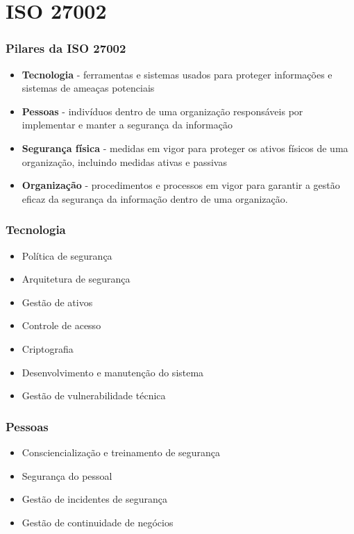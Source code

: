 \section{ISO 27002}
\begin{frame}
  \frametitle{Pilares da ISO 27002}
  \begin{itemize}
    \item \textbf{Tecnologia} - ferramentas e sistemas usados para proteger informações e sistemas de ameaças potenciais
    \item \textbf{Pessoas} - indivíduos dentro de uma organização responsáveis por implementar e manter a segurança da informação
    \item \textbf{Segurança física} - medidas em vigor para proteger os ativos físicos de uma organização, incluindo medidas ativas e passivas
    \item \textbf{Organização} - procedimentos e processos em vigor para garantir a gestão eficaz da segurança da informação dentro de uma organização.
  \end{itemize}
\end{frame}

\begin{frame}
  \frametitle{Tecnologia}
  \begin{itemize}
    \item Política de segurança
    \item Arquitetura de segurança
    \item Gestão de ativos
    \item Controle de acesso
    \item Criptografia
    \item Desenvolvimento e manutenção do sistema
    \item Gestão de vulnerabilidade técnica
  \end{itemize}
\end{frame}

\begin{frame}
  \frametitle{Pessoas}
  \begin{itemize}
    \item Consciencialização e treinamento de segurança
    \item Segurança do pessoal
    \item Gestão de incidentes de segurança
    \item Gestão de continuidade de negócios
  \end{itemize}
\end{frame}

